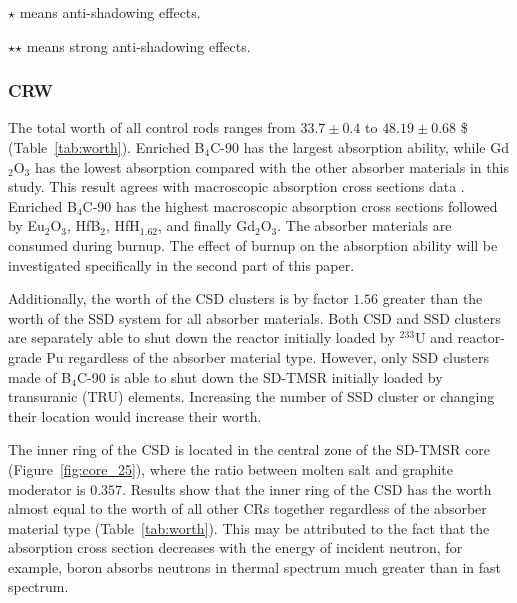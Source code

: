 \begin{sidewaystable}
	\begin{tablenotes}
		\tiny
		\item  $\star$  means anti-shadowing effects.
		\item  $\star$$\star$ means strong anti-shadowing effects.
	\end{tablenotes}
	\label{tab:worth}
\end{sidewaystable}

\subsubsection{CRW} \label{CR_worth}

The total worth of all control rods ranges from $33.7\pm0.4$ to $48.19\pm0.68$ \$ (Table~\ref{tab:worth}). Enriched B$_4$C-90 has the largest absorption ability, while Gd$_2$O$_3$ has the lowest absorption compared with the other absorber materials in this study. This result agrees with macroscopic absorption cross sections data \cite{guo2019optimized}. Enriched B$_4$C-90 has the highest macroscopic absorption cross sections followed by Eu$_2$O$_3$, HfB$_2$, HfH$_{1.62}$, and finally Gd$_2$O$_3$. The absorber materials are consumed during burnup. The effect of burnup on the absorption ability will be investigated specifically in the second part of this paper.

Additionally, the worth of the CSD clusters is by factor $1.56$ greater than the worth of the SSD system for all absorber materials. Both CSD and SSD clusters are separately able to shut down the reactor initially loaded by $^{233}$U and reactor-grade Pu regardless of the absorber material type. However, only SSD clusters made of B$_4$C-90 is able to shut down the SD-TMSR initially loaded by transuranic (TRU) elements. Increasing the number of SSD cluster or changing their location would increase their worth.

The inner ring of the CSD is located in the central zone of the SD-TMSR core (Figure~\ref{fig:core_25}), where the ratio between molten salt and graphite moderator is $0.357$. Results show that the inner ring of the CSD has the worth almost equal to the worth of all other CRs together regardless of the absorber material type (Table~\ref{tab:worth}). This may be attributed to the fact that the absorption cross section decreases with the energy of incident neutron, for example, boron absorbs neutrons in thermal spectrum much greater than in fast spectrum.

